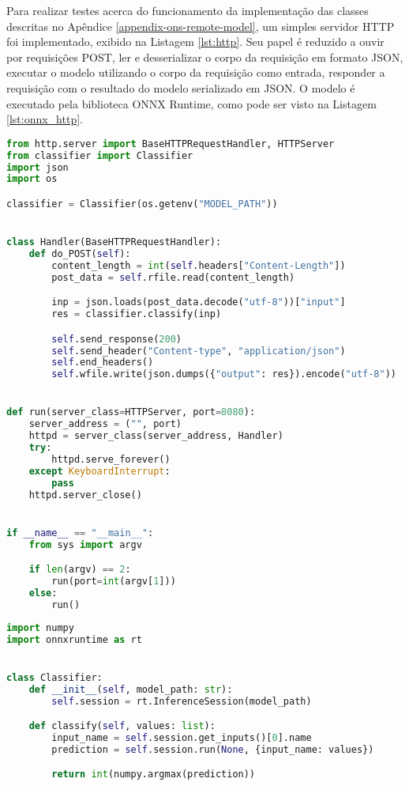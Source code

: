 Para realizar testes acerca do funcionamento da implementação das classes descritas no Apêndice \ref{appendix-ons-remote-model}, um simples servidor HTTP foi implementado, exibido na Listagem \ref{lst:http}. Seu papel é reduzido a ouvir por requisições POST, ler e desserializar o corpo da requisição em formato JSON, executar o modelo utilizando o corpo da requisição como entrada, responder a requisição com o resultado do modelo serializado em JSON. O modelo é executado pela biblioteca ONNX Runtime, como pode ser visto na Listagem \ref{lst:onnx_http}.

\begin{lstlisting}[language=python, caption=Simples servidor HTTP para testes de integração, label={lst:http}]
from http.server import BaseHTTPRequestHandler, HTTPServer
from classifier import Classifier
import json
import os

classifier = Classifier(os.getenv("MODEL_PATH"))


class Handler(BaseHTTPRequestHandler):
    def do_POST(self):
        content_length = int(self.headers["Content-Length"])
        post_data = self.rfile.read(content_length)

        inp = json.loads(post_data.decode("utf-8"))["input"]
        res = classifier.classify(inp)

        self.send_response(200)
        self.send_header("Content-type", "application/json")
        self.end_headers()
        self.wfile.write(json.dumps({"output": res}).encode("utf-8"))


def run(server_class=HTTPServer, port=8080):
    server_address = ("", port)
    httpd = server_class(server_address, Handler)
    try:
        httpd.serve_forever()
    except KeyboardInterrupt:
        pass
    httpd.server_close()


if __name__ == "__main__":
    from sys import argv

    if len(argv) == 2:
        run(port=int(argv[1]))
    else:
        run()
\end{lstlisting}


\begin{lstlisting}[language=python, caption=Classificador usado nas medições e pelo servidor HTTP, label={lst:onnx_http}]
import numpy
import onnxruntime as rt


class Classifier:
    def __init__(self, model_path: str):
        self.session = rt.InferenceSession(model_path)

    def classify(self, values: list):
        input_name = self.session.get_inputs()[0].name
        prediction = self.session.run(None, {input_name: values})

        return int(numpy.argmax(prediction))
\end{lstlisting}